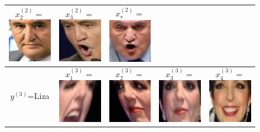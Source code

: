 \documentclass[twoside,11pt]{article}
\begin{document}
\begin{figure}
\begin{tabular}{|c|ccc|c|}
  $x_2^{(2)} = $\includegraphics[scale = 0.2]{face_photos/Jean-Pierre_Raffarin_0002.png} &  
  $x_3^{(2)} = $\includegraphics[scale = 0.2]{face_photos/Jean-Pierre_Raffarin_0003.png} &  
  $x_*^{(2)} = $\includegraphics[scale = 0.2]{face_photos/Jean-Pierre_Raffarin_0004.png} \\ \hline
$y^{(3)}$=Liza & 
  $x_1^{(3)} = $\includegraphics[scale = 0.2]{face_photos/Liza_Minnelli_0001.png} &  
  $x_2^{(3)} = $\includegraphics[scale = 0.2]{face_photos/Liza_Minnelli_0002.png} &  
  $x_3^{(3)} = $\includegraphics[scale = 0.2]{face_photos/Liza_Minnelli_0003.png} &  
  $x_4^{(3)} = $\includegraphics[scale = 0.2]{face_photos/Liza_Minnelli_0004.png} \\ \hline

\end{tabular}
\end{figure}
\end{document}
